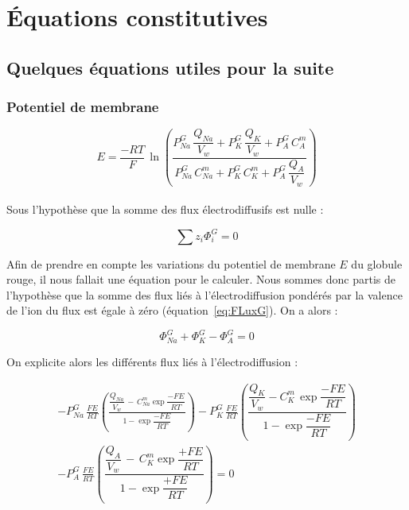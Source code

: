 \documentclass[a4paper,fleqn]{article}
\begin{document}
\section{Équations constitutives}

\subsection{Quelques équations utiles pour la suite}

\subsubsection*{Potentiel de membrane}
\begin{equation}
E=\dfrac{-RT}{F}\,\ln\left(\dfrac{P_{Na}^{G}\,\dfrac{Q_{Na}}{V_w}+P_{K}^{G}\,\dfrac{Q_{K}}{V_w}+P_{A}^{G}\,C_{A}^{m}}{P_{Na}^{G}\,C_{Na}^{m}+P_{K}^{G}\,C_{K}^{m}+P_{A}^{G}\,\dfrac{Q_{A}}{V_w}}\right)
\end{equation}\\

Sous l'hypothèse que la somme des flux électrodiffusifs est nulle :

\begin{equation}
\sum z_i\Phi_{i}^G = 0\label{eq:FLuxG}
\end{equation}

Afin de prendre en compte les variations du potentiel de membrane $E$ du globule rouge, il nous fallait une équation pour le calculer. Nous sommes donc partis de l'hypothèse que la somme des flux liés à l'électrodiffusion pondérés par la valence de l'ion du flux est égale à zéro (équation~\eqref{eq:FLuxG}). On a alors :

\begin{equation}
\Phi_{Na}^G+\Phi_{K}^G-\Phi_{A}^G=0
\end{equation}

On explicite alors les différents flux liés à l'électrodiffusion :

\begin{multline}
-P_{Na}^{G}\,\frac{FE}{RT}\left(\frac{\dfrac{Q_{Na}}{V_w}\,-\,{C_{Na}^{m}\exp{\dfrac{-FE}{RT}}}}{1 - \exp{\dfrac{-FE}{RT}}}\right)-P_{K}^{G}\,\frac{FE}{RT}\left(\dfrac{\dfrac{Q_{K}}{V_w}-{C_{K}^{m}\,\exp{\dfrac{-FE}{RT}}}}{1 - \exp{\dfrac{-FE}{RT}}}\right)\\
-P_{A}^{G}\,\frac{FE}{RT}\left(\dfrac{\dfrac{Q_{A}}{V_w}\,-\,{C_{K}^{m}\exp{\dfrac{+FE}{RT}}}}{1 - \exp{\dfrac{+FE}{RT}}}\right)=0
\end{multline}
\end{document}
